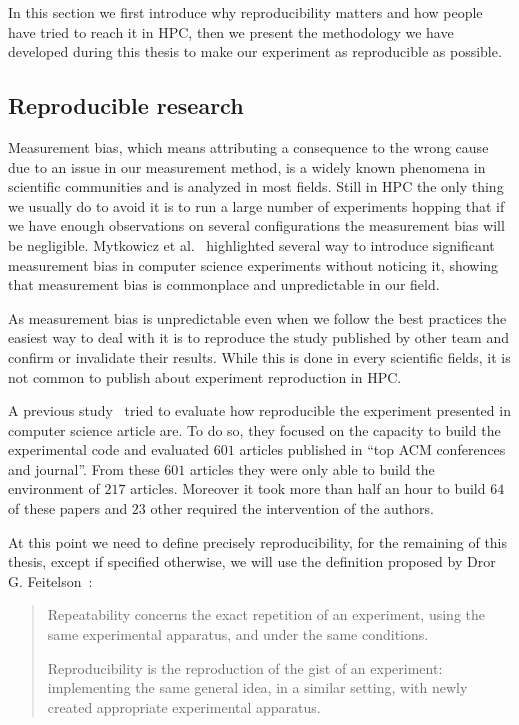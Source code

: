 In this section we first introduce why reproducibility matters and how people
have tried to reach it in \gls{HPC}, then we present the methodology we have
developed during this thesis to make our experiment as reproducible as
possible.


\subsection{Reproducible research}

Measurement bias, which means attributing a consequence to the wrong cause due to
an issue in our measurement method, is a widely known phenomena in scientific communities and is
analyzed in most fields. Still in \gls{HPC} the only thing we usually do to avoid it
is to run a large number of experiments hopping that if we have enough
observations on several configurations the measurement bias will be
negligible. Mytkowicz et al.~\cite{Mytkowicz09Producing} highlighted several
way to introduce significant measurement bias in computer science experiments
without noticing it, showing that measurement bias is commonplace and
unpredictable in our field.

As measurement bias is unpredictable even when we follow the best practices
the easiest way to deal with it is to reproduce the study published by other
team and confirm or invalidate their results. While this is done in every
scientific fields, it is not common to publish about experiment reproduction
in \gls{HPC}.

A previous study~\cite{Collberg15Repeatability} tried to evaluate how
reproducible the experiment presented in computer science article are. To do
so, they focused on the capacity to build the experimental code and evaluated
$601$ articles published in “top ACM conferences and journal”. From these
$601$ articles they were only able to build the environment of $217$ articles.
Moreover it took more than half an hour to build $64$ of these papers and $23$
other required the intervention of the authors.

At this point we need to define precisely reproducibility, for the remaining
of this thesis, except if specified otherwise, we will use the definition
proposed by Dror G. Feitelson~\cite{Feitelson15From}:

\begin{quote}
    Repeatability concerns the exact repetition of an experiment, using the
    same experimental apparatus, and under the same conditions.

    Reproducibility is the reproduction of the gist of an experiment:
    implementing the same general idea, in a similar setting, with newly
    created appropriate experimental apparatus.
\end{quote}

